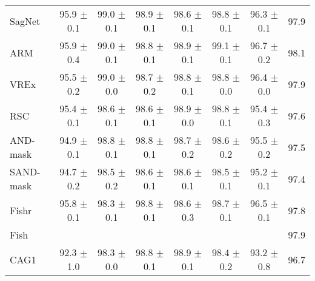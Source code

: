 \documentclass{article}
\begin{document}
\begin{center}
{\begin{tabular}{lccccccc}
SagNet               & 95.9 $\pm$ 0.1       & 99.0 $\pm$ 0.1       & 98.9 $\pm$ 0.1       & 98.6 $\pm$ 0.1       & 98.8 $\pm$ 0.1       & 96.3 $\pm$ 0.1       & 97.9                 \\
ARM                  & 95.9 $\pm$ 0.4       & 99.0 $\pm$ 0.1       & 98.8 $\pm$ 0.1       & 98.9 $\pm$ 0.1       & 99.1 $\pm$ 0.1       & 96.7 $\pm$ 0.2       & 98.1                 \\
VREx                 & 95.5 $\pm$ 0.2       & 99.0 $\pm$ 0.0       & 98.7 $\pm$ 0.2       & 98.8 $\pm$ 0.1       & 98.8 $\pm$ 0.0       & 96.4 $\pm$ 0.0       & 97.9                 \\
RSC                  & 95.4 $\pm$ 0.1       & 98.6 $\pm$ 0.1       & 98.6 $\pm$ 0.1       & 98.9 $\pm$ 0.0       & 98.8 $\pm$ 0.1       & 95.4 $\pm$ 0.3       & 97.6                 \\
AND-mask             & 94.9 $\pm$ 0.1       & 98.8 $\pm$ 0.1       & 98.8 $\pm$ 0.1       & 98.7 $\pm$ 0.2       & 98.6 $\pm$ 0.2       & 95.5 $\pm$ 0.2       & 97.5                 \\
SAND-mask            & 94.7 $\pm$ 0.2       & 98.5 $\pm$ 0.2       & 98.6 $\pm$ 0.1       & 98.6 $\pm$ 0.1       & 98.5 $\pm$ 0.1       & 95.2 $\pm$ 0.1       & 97.4                 \\
Fishr                & 95.8 $\pm$ 0.1       & 98.3 $\pm$ 0.1       & 98.8 $\pm$ 0.1       & 98.6 $\pm$ 0.3       & 98.7 $\pm$ 0.1       & 96.5 $\pm$ 0.1       & 97.8                 \\
Fish                 &                      &                      &                      &                      &                      &                      & 97.9                 \\
\midrule
CAG1                 & 92.3 $\pm$ 1.0       & 98.3 $\pm$ 0.0       & 98.8 $\pm$ 0.1       & 98.9 $\pm$ 0.1       & 98.4 $\pm$ 0.2       & 93.2 $\pm$ 0.8       & 96.7                 \\

\bottomrule
\end{tabular}}
\end{center}
\end{document}
